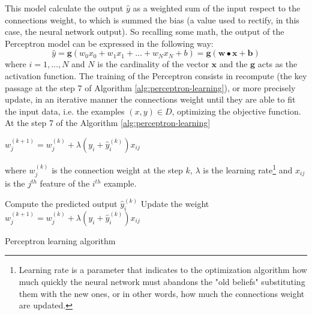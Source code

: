 This model calculate the output $\hat{y}$ as a weighted sum of the input respect to the connections weight, to which is summed the bias (a value used to rectify, in this case, the neural network output). So recalling some math, the output of the Perceptron model can be expressed in the following way:
\begin{equation}
	\hat{y} = \textbf{g}(w_{0}x_{0} + w_{1}x_{1} + \dots + w_{N}x_{N} + b  ) = \textbf{g}(\textbf{w} \bullet \textbf{x} + \textbf{b})
\end{equation}
where $i = 1, \dots, N$ and $N$ is the cardinality of the vector $\textbf{x}$ and the $\textbf{g}$ acts as the activation function.
The training of the Perceptron consists in recompute (the key passage at the step 7 of Algorithm \ref{alg:perceptron-learning}), or more precisely update, in an iterative manner the connections weight until they are able to fit the input data, i.e. the examples $(x, y) \in D$, optimizing the objective function.
At the step 7 of the Algorithm \ref{alg:perceptron-learning}
\begin{center}
	$w_{j}^{(k + 1)} = w_{j}^{(k)} + \lambda(y_{i} + \hat{y}_{i}^{(k)})x_{ij}$	
\end{center}
where $w_{j}^{(k)}$ is the connection weight at the step $k$, $\lambda$ is the learning rate\footnote{Learning rate is a parameter that indicates to the optimization algorithm how much quickly the neural network must abandons the "old beliefs" substituting them with the new ones, or in other words, how much the connections weight are updated.} and $x_{ij}$ is the $j^{th}$ feature of the $i^{th}$ example.

\begin{algorithm}
	\begin{algorithmic}[1]
		\Repeat
				\State Compute the predicted output $\hat{y}_{i}^{(k)}$
					\State Update the weight $w_{j}^{(k + 1)} = w_{j}^{(k)} + \lambda(y_{i} + \hat{y}_{i}^{(k)})x_{ij}$
				\EndFor
			\EndFor
	\end{algorithmic}
	\caption{Perceptron learning algorithm \cite{ITDM:2014}}\label{alg:perceptron-learning}
\end{algorithm}


